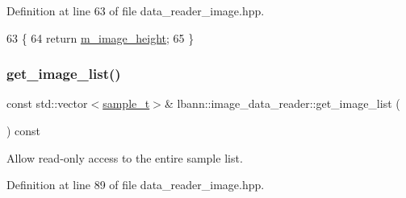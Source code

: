 Definition at line 63 of file data\+\_\+reader\+\_\+image.\+hpp.


\begin{DoxyCode}
63                                        \{
64     \textcolor{keywordflow}{return} \hyperlink{classlbann_1_1image__data__reader_a0632efa3deaa9d61e671f741909eb3fe}{m\_image\_height};
65   \}
\end{DoxyCode}
\mbox{\label{classlbann_1_1image__data__reader_aa03599a5f66d498d4bb90c50ae70c82a}} 
\subsubsection{\texorpdfstring{get\+\_\+image\+\_\+list()}{get\_image\_list()}}
{\footnotesize\ttfamily const std\+::vector$<$\hyperlink{classlbann_1_1image__data__reader_a7580011ef6ef9da32e1a3bc49ad0706c}{sample\+\_\+t}$>$\& lbann\+::image\+\_\+data\+\_\+reader\+::get\+\_\+image\+\_\+list (\begin{DoxyParamCaption}{ }\end{DoxyParamCaption}) const\hspace{0.3cm}{\ttfamily [inline]}}



Allow read-\/only access to the entire sample list. 



Definition at line 89 of file data\+\_\+reader\+\_\+image.\+hpp.


